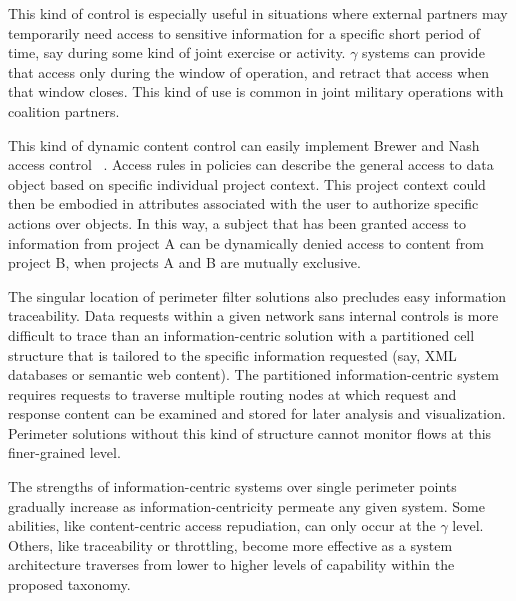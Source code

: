 This kind of control is especially useful in situations where external partners may temporarily need access to sensitive information for a specific short period of time, say during some kind of joint exercise or activity.  $\gamma$ systems can provide that access only during the window of operation, and retract that access when that window closes.  This kind of use is common in joint military operations with coalition partners.

This kind of dynamic content control can easily implement Brewer and Nash access control ~\cite{Brewer89}.  Access rules in policies can describe the general access to data object based on specific individual project context.  This project context could then be embodied in attributes associated with the user to authorize specific actions over objects.  In this way, a subject that has been granted access to information from project A can be dynamically denied access to content from project B, when projects A and B are mutually exclusive.

The singular location of perimeter filter solutions also precludes easy information traceability.  Data requests within a given network sans internal controls is more difficult to trace than an information-centric solution with a partitioned cell structure that is tailored to the specific information requested (say, XML databases or semantic web content).  The partitioned information-centric system requires requests to traverse multiple routing nodes at which request and response content can be examined and stored for later analysis and visualization.  Perimeter solutions without this kind of structure cannot monitor flows at this finer-grained level.

The strengths of information-centric systems over single perimeter points gradually increase as information-centricity permeate any given system.  Some abilities, like content-centric access repudiation, can only occur at the $\gamma$ level.  Others, like traceability or throttling, become more effective as a system architecture traverses from lower to higher levels of capability within the proposed taxonomy.